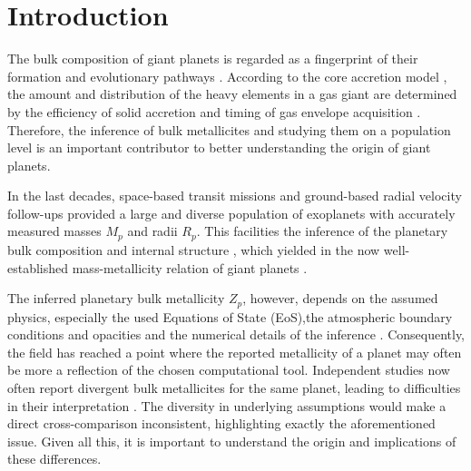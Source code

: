 \documentclass{aa}
\begin{document}

\maketitle


\section{Introduction}\label{sec:introduction}
The bulk composition of giant planets is regarded as a fingerprint of their formation and evolutionary pathways \citep[e.g.,][]{Helled2014,Johansen2017,Ginzburg2020}. According to the core accretion model \citep{Mizuno1980,pollack_formation_1996}, the amount and distribution of the heavy elements in a gas giant are determined by the efficiency of solid accretion and timing of gas envelope acquisition \citep[e.g.,][]{ 2017ApJ...840L...4H,lozovsky_jupiters_2017,valletta_deposition_2019}. Therefore, the inference of bulk metallicites and studying them on a population level is an important contributor to better understanding the origin of giant planets.

In the last decades, space-based transit missions and ground-based radial velocity follow-ups provided a large and diverse population of exoplanets with accurately measured masses $M_p$ and radii $R_p$. This facilities the inference of the planetary bulk composition and internal structure \citep[e.g.,][]{fortney_planetary_2007,seager_mass-radius_2007, spiegel_structure_2014,jontof-hutter_compositional_2019,muller_towards_2023}, which yielded in the now well-established mass-metallicity relation of giant planets \citep{thorngren_mass-metallicity_2016,teske_metal-rich_2019,muller_bulk_2025,peerani_how_2025}.

The inferred planetary bulk metallicity $Z_p$, however, depends on the assumed physics, especially the used Equations of State (EoS),the atmospheric boundary conditions and opacities and the numerical details of the inference \citep{2008A&A...482..315B, vazan_effect_2013,2019Atmos..10..664P,howard_accounting_2023,howard_giant_2025}. Consequently, the field has reached a point where the reported metallicity of a planet may often be more a reflection of the chosen computational tool. Independent studies now often report divergent bulk metallicites for the same planet, leading to difficulties in their interpretation \citep{thorngren_mass-metallicity_2016,muller_bulk_2025,chachan_revising_2025}. The diversity in underlying assumptions would make a direct cross-comparison inconsistent, highlighting exactly the aforementioned issue. Given all this, it is important to understand the origin and implications of these differences. 
\end{document}
